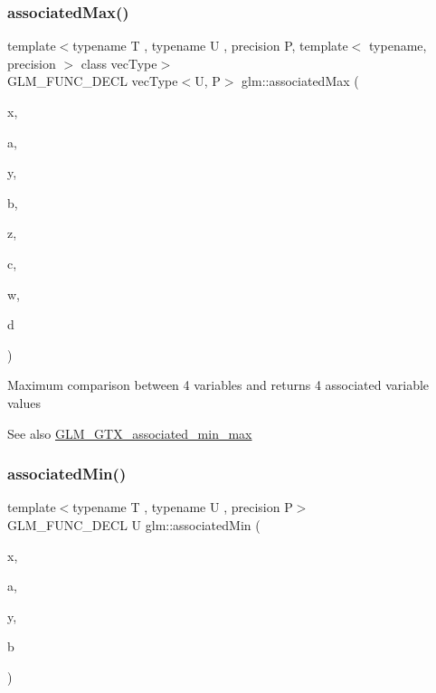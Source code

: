 \subsubsection{\texorpdfstring{associated\+Max()}{associatedMax()}\hspace{0.1cm}{\footnotesize\ttfamily [12/12]}}
{\footnotesize\ttfamily template$<$typename T , typename U , precision P, template$<$ typename, precision $>$ class vec\+Type$>$ \\
G\+L\+M\+\_\+\+F\+U\+N\+C\+\_\+\+D\+E\+CL vec\+Type$<$U, P$>$ glm\+::associated\+Max (\begin{DoxyParamCaption}\item[{vec\+Type$<$ T, P $>$ const \&}]{x,  }\item[{U}]{a,  }\item[{vec\+Type$<$ T, P $>$ const \&}]{y,  }\item[{U}]{b,  }\item[{vec\+Type$<$ T, P $>$ const \&}]{z,  }\item[{U}]{c,  }\item[{vec\+Type$<$ T, P $>$ const \&}]{w,  }\item[{U}]{d }\end{DoxyParamCaption})}

Maximum comparison between 4 variables and returns 4 associated variable values \begin{DoxySeeAlso}{See also}
\hyperlink{group__gtx__associated__min__max}{G\+L\+M\+\_\+\+G\+T\+X\+\_\+associated\+\_\+min\+\_\+max} 
\end{DoxySeeAlso}
\mbox{\label{group__gtx__associated__min__max_gacc01bd272359572fc28437ae214a02df}} 
\subsubsection{\texorpdfstring{associated\+Min()}{associatedMin()}\hspace{0.1cm}{\footnotesize\ttfamily [1/10]}}
{\footnotesize\ttfamily template$<$typename T , typename U , precision P$>$ \\
G\+L\+M\+\_\+\+F\+U\+N\+C\+\_\+\+D\+E\+CL U glm\+::associated\+Min (\begin{DoxyParamCaption}\item[{T}]{x,  }\item[{U}]{a,  }\item[{T}]{y,  }\item[{U}]{b }\end{DoxyParamCaption})}

